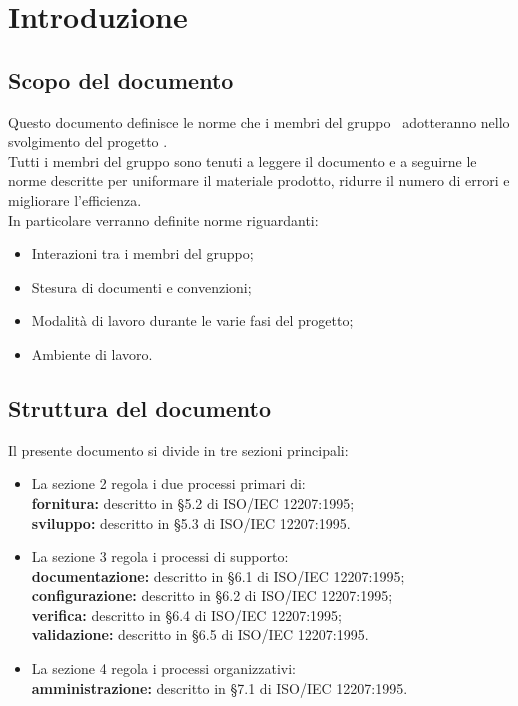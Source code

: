 \documentclass[../NormeDiProgetto.tex]{subfiles}
\begin{document}
	\section{Introduzione}
		\subsection{Scopo del documento}
			Questo documento definisce le norme che i membri del gruppo
			\kaleidoscode\ adotteranno nello svolgimento del progetto
			\progetto.\\
			Tutti i membri del gruppo sono tenuti a leggere il documento
			e a seguirne le norme descritte per uniformare il materiale
			prodotto, ridurre il numero di errori e migliorare l'efficienza.\\
			In particolare verranno definite norme riguardanti:
			\begin{itemize}
				\item Interazioni tra i membri del gruppo;
				\item Stesura di documenti e convenzioni;
				\item Modalità di lavoro durante le varie fasi del progetto;
				\item Ambiente di lavoro.
			\end{itemize}
		\subsection{Struttura del documento}
			Il presente documento si divide in tre sezioni principali:
			\begin{itemize}
				\item La sezione 2 regola i due processi primari di:\\
				\textbf{fornitura:} descritto in §5.2 di ISO/IEC 12207:1995;\\
				\textbf{sviluppo:} descritto in §5.3 di ISO/IEC 12207:1995.
				\item La sezione 3 regola i processi di supporto:\\
				\textbf{documentazione:} descritto in §6.1 di ISO/IEC 12207:1995;\\
				\textbf{configurazione:} descritto in §6.2 di ISO/IEC 12207:1995;\\
				\textbf{verifica:} descritto in §6.4 di ISO/IEC 12207:1995;\\
				\textbf{validazione:} descritto in §6.5 di ISO/IEC 12207:1995.
				\item La sezione 4 regola i processi organizzativi:\\
				\textbf{amministrazione:} descritto in §7.1 di ISO/IEC 12207:1995.
			\end{itemize}
			 
\end{document}
